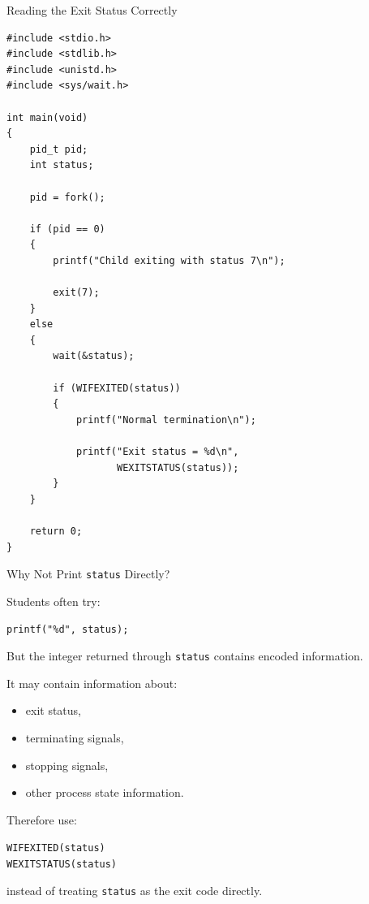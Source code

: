 \documentclass[aspectratio=169]{beamer}
\begin{document}
\begin{frame}[fragile]{Reading the Exit Status Correctly}

\begin{lstlisting}[style=cstyle]
#include <stdio.h>
#include <stdlib.h>
#include <unistd.h>
#include <sys/wait.h>

int main(void)
{
    pid_t pid;
    int status;

    pid = fork();

    if (pid == 0)
    {
        printf("Child exiting with status 7\n");

        exit(7);
    }
    else
    {
        wait(&status);

        if (WIFEXITED(status))
        {
            printf("Normal termination\n");

            printf("Exit status = %d\n",
                   WEXITSTATUS(status));
        }
    }

    return 0;
}
\end{lstlisting}

\end{frame}

\begin{frame}{Why Not Print \texttt{status} Directly?}

Students often try:

\begin{center}
\texttt{printf("\%d", status);}
\end{center}

But the integer returned through \texttt{status} contains encoded information.

It may contain information about:

\begin{itemize}

    \item exit status,

    \item terminating signals,

    \item stopping signals,

    \item other process state information.

\end{itemize}

Therefore use:

\begin{center}
\texttt{WIFEXITED(status)}\\
\texttt{WEXITSTATUS(status)}
\end{center}

instead of treating \texttt{status} as the exit code directly.

\end{frame}
\end{document}

